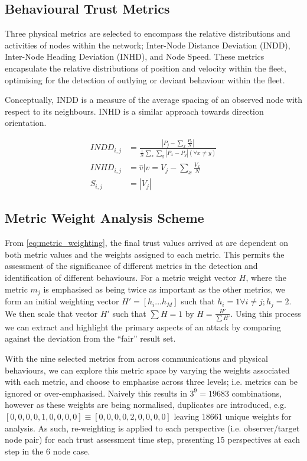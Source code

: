\documentclass{aamas2016}
\begin{document}
\subsection{Behavioural Trust Metrics}

Three physical metrics are selected to encompass the relative distributions and activities of nodes within the network; Inter-Node Distance Deviation (INDD), Inter-Node Heading Deviation (INHD), and Node Speed. These metrics encapsulate the relative distributions of position and velocity within the fleet, optimising for the detection of outlying or deviant behaviour within the fleet.

Conceptually, INDD is a measure of the average spacing of an observed node with respect to its neighbours. INHD is a similar approach towards direction orientation.

\begin{align}
	INDD_{i,j} &= \frac{|P_j - \sum_x \frac{P_x}{N}|}{\frac{1}{N}\sum_x \sum_y{|P_x - P_y| (\forall x \neq y)}}\\
	INHD_{i,j} &= \hat{v} \vert v= V_j - \sum_x{\frac{V_x}{N}}\\
	S_{i,j} &= |V_j|
\end{align}

\subsection{Metric Weight Analysis Scheme}

From \eqref{eq:metric_weighting}, the final trust values arrived at are dependent on both metric values and the weights assigned to each metric. This permits the assessment of the significance of different metrics in the detection and identification of different behaviours. 
For a metric weight vector $H$, where the metric $m_j$ is emphasised as being twice as important as the other metrics, we form an initial weighting vector $H'=[h_i...h_M]$ such that $h_i = 1 \forall i \ne j; h_j=2$. We then scale that vector $H'$ such that $\sum H = 1$ by $H= \frac{H'}{\sum H'}$.
Using this process we can extract and highlight the primary aspects of an attack by comparing against the deviation from the ``fair'' result set.

With the nine selected metrics from across communications and physical behaviours, we can explore this metric space by varying the weights associated with each metric, and choose to emphasise across three levels; i.e. metrics can be ignored or over-emphasised. Naively this results in $3^9 = 19683$ combinations, however as these weights are being normalised, duplicates are introduced, e.g. $[0,0,0,0,1,0,0,0,0] \equiv [0,0,0,0,2,0,0,0,0]$ leaving 18661 unique weights for analysis.
As such, re-weighting is applied to each perspective (i.e. observer/target node pair) for each trust assessment time step, presenting 15 perspectives at each step in the 6 node case.
\end{document}
